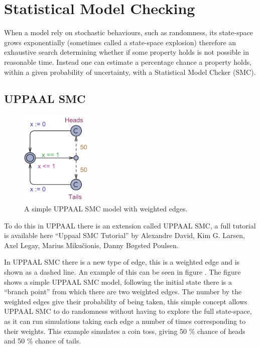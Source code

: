 \newpage
\section{Statistical Model Checking}

When a model rely on stochastic behaviours, such as randomness, its state-space grows exponentially (sometimes called a state-space explosion) therefore an exhaustive search determining whether if some property holds is not possible in reasonable time. 
Instead one can estimate a percentage chance a property holds, within a given probability of uncertainty, with a Statistical Model Chcker (SMC). 

\subsection{UPPAAL SMC}
\begin{figure}
\centering
  \includegraphics[width=0.3\textwidth]{Figures/Model/Simple_SMC.pdf} 
\caption{A simple UPPAAL SMC model with weighted edges. }
\label{fig:simpleSMC}
\end{figure}

To do this in UPPAAL there is an extension called UPPAAL SMC, a full tutorial is available here ``Uppaal SMC Tutorial''\cite{DBLP:journals/sttt/DavidLLMP15} by Alexandre David, Kim G. Larsen, Axel Legay, Marius Miku\v{c}ionis, Danny B\o gsted Poulsen.

In UPPAAL SMC there is a new type of edge, this is a weighted edge and is shown as a dashed line. 
An example of this can be seen in figure . 
The figure shows a simple UPPAAL SMC model, following the initial state there is a ``branch point'' from which there are two weighted edges.
The number by the weighted edges give their probability of being taken, this simple concept allows UPPAAL SMC to do randomness without having to explore the full state-space, as it can run simulations taking each edge a number of times corresponding to their weights. 
This example simulates a coin toss, giving 50 \% chance of heads and 50 \% chance of tails. 

